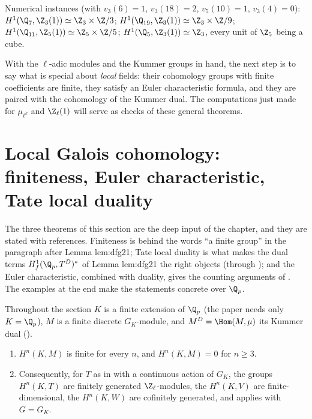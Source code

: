 \noindent Numerical instances (with $v_3(6)=1$, $v_3(18)=2$, $v_5(10)=1$, $v_3(4)=0$): $H^1(\Q_7,\Z_3(1))\simeq\Z_3\times\Z/3$; $H^1(\Q_{19},\Z_3(1))\simeq\Z_3\times\Z/9$;
$H^1(\Q_{11},\Z_5(1))\simeq\Z_5\times\Z/5$; $H^1(\Q_5,\Z_3(1))\simeq\Z_3$, every unit of $\Z_5$ being a cube.

With the $\ell$-adic modules and the Kummer groups in hand, the next step is to say what is special about \emph{local} fields: their cohomology groups with finite
coefficients are finite, they satisfy an Euler characteristic formula, and they are paired with the cohomology of the Kummer dual. The computations just made for $\mu_{\ell^k}$
and $\Z_\ell(1)$ will serve as checks of these general theorems.
\section[Local Galois cohomology]{Local Galois cohomology: finiteness, Euler characteristic, Tate local duality}\label{sec:galcoh:local}

The three theorems of this section are the deep input of the chapter, and they are stated with references. Finiteness is behind the words ``a finite group''
in the paragraph after Lemma lem:dfg21; Tate local duality is what makes the dual terms $H^1_f(\Q_p,T^D)^*$ of Lemma lem:dfg21 the right objects (through
); and the Euler characteristic, combined with duality, gives the counting arguments of . The
examples at the end make the statements concrete over $\Q_p$.

Throughout the section $K$ is a finite extension of $\Q_p$ (the paper needs only $K=\Q_p$), $M$ is a finite discrete $G_K$-module, and $M^D=\Hom(M,\mu)$ its Kummer dual
().

\begin{theorem}\label{thm:galcoh:local-finiteness}
\begin{enumerate}[label=(\roman*)]
\item $H^n(K,M)$ is finite for every $n$, and $H^n(K,M)=0$ for $n\ge3$.
\item Consequently, for $T$ as in  with a continuous action of $G_K$, the groups $H^n(K,T)$ are finitely generated $\Z_\ell$-modules, the
$H^n(K,V)$ are finite-dimensional, the $H^n(K,W)$ are cofinitely generated, and  applies with $G=G_K$.
\end{enumerate}
\end{theorem}

